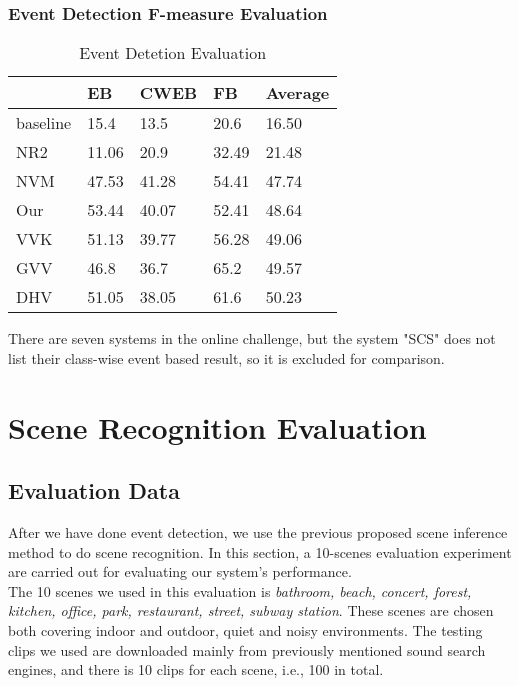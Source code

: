 \subsubsection{Event Detection F-measure Evaluation}
\begin{table}[htb]
\centering
\caption{Event Detetion Evaluation}
\begin{tabular}{lllll}
\hline
         & EB    & CWEB  & FB    & Average \\
\hline
baseline & 15.4  & 13.5  & 20.6  & 16.50   \\
NR2      & 11.06 & 20.9  & 32.49 & 21.48   \\
NVM      & 47.53 & 41.28 & 54.41 & 47.74   \\
Our      & 53.44 & 40.07 & 52.41 & 48.64   \\
VVK      & 51.13 & 39.77 & 56.28 & 49.06   \\
GVV      & 46.8  & 36.7  & 65.2  & 49.57   \\
DHV      & 51.05 & 38.05 & 61.6  & 50.23   \\     
\hline
\end{tabular}
\end{table}
There are seven systems in the online challenge, but the system "SCS" does not list their class-wise event based result, so it is excluded for comparison. 
\begin{figure}[htb]
\centering

\caption{}
\label{fig:componentTime}
\end{figure}


\section{Scene Recognition Evaluation}
\subsection{Evaluation Data}
After we have done event detection, we use the previous proposed scene inference method to do scene recognition. 
In this section, a 10-scenes evaluation experiment are carried out for evaluating our system's performance.\\ 

The 10 scenes we used in this evaluation is \textit{bathroom, beach, concert, forest, kitchen, office, park, restaurant, street, subway station}. 
These scenes are chosen both covering indoor and outdoor, quiet and noisy environments. 
The testing clips we used are downloaded mainly from previously mentioned sound search engines, and there is 10 clips for each scene, i.e., 100 in total. \\ 


